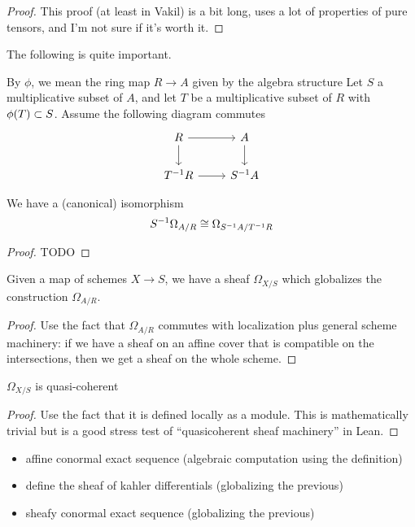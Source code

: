 \begin{proof}
	This proof (at least in Vakil) is a bit long, uses a lot 
	of properties of pure tensors, and I'm not sure
	if it's worth it.
\end{proof}

The following is quite important.
\begin{lem}
	By \(\phi\), we mean the ring map \(R \to A\) 
	given by the algebra structure
	Let \(S\) a multiplicative subset of \(A\),
	and let \(T\) be a multiplicative subset
	of \(R\) with \(\phi(T) \subset S\).
	Assume the following diagram commutes
	\[
	\begin{tikzcd}
	R \arrow{r}{} \arrow{d}[swap]{} &
	A \arrow{d}{} \\
	T^{-1}R \arrow{r}{} &
	S^{-1}A
	\end{tikzcd}
	\]
	
	We have a (canonical) isomorphism
	\[
	S^{-1}\Omega_{A / R} \cong
	\Omega_{S^{-1}A / T^{-1}R}	
	\] 
\end{lem}

\begin{proof}
	TODO
\end{proof}

\begin{lem}
	Given a map of schemes 
	\(X \to S\),
	we have a 
	sheaf \(\Omega_{X / S}\) 
	which globalizes the construction
	\(\Omega_{A / R}\).
\end{lem}

\begin{proof}
	Use the fact that 
	\(\Omega_{A / R}\)
	commutes with localization 
	plus general scheme machinery:
	if we have a sheaf on an affine 
	cover that is compatible on the intersections,
	then we get a sheaf on the whole scheme.
\end{proof}

\begin{lem}
	\(\Omega_{X / S}\) is quasi-coherent
\end{lem}

\begin{proof}
	Use the fact that it is defined locally
	as a module.
	This is mathematically trivial but 
	is a good stress test of 
	``quasicoherent sheaf machinery''
	in Lean.
\end{proof}

\begin{itemize}
    \item affine conormal exact sequence
		(algebraic computation using the definition)
	\item define the sheaf of kahler differentials
		(globalizing the previous)
	\item sheafy conormal exact sequence
		(globalizing the previous)
\end{itemize}


